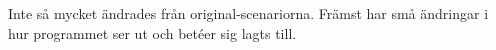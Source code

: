 Inte så mycket ändrades från original-scenariorna.
Främst har små ändringar i hur programmet ser ut
och betéer sig lagts till.

